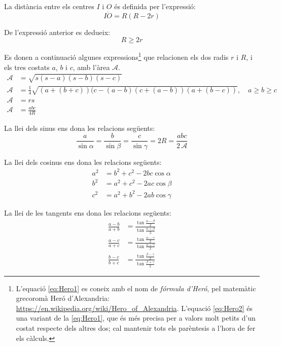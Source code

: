 La distància entre els centres $I$ i $O$ és definida per l'expressió:
\begin{equation}
	\overline{IO} = R(R-2r)
\end{equation}

De l'expressió anterior es dedueix:
\begin{equation}
	R  \geq 2r
\end{equation}

Es donen a continuació algunes expressions\footnote{L'equació \eqref{eq:Hero1} es coneix amb el nom de \emph{fórmula d'Heró}, pel matemàtic grecoromà Heró d'Alexandria: \href{https://en.wikipedia.org/wiki/Hero_of_Alexandria}{https:/\!\!/en.wikipedia.org/wiki/Hero\_of\_Alexandria}. L'equació \eqref{eq:Hero2} és una variant  de la \eqref{eq:Hero1}, que és més precisa per a valors molt petits d'un costat respecte dels altres dos; cal mantenir tots els parèntesis a l'hora de fer els càlculs.} que relacionen els dos radis $r$ i $R$, i els tres costats $a$, $b$ i $c$,  amb l'àrea $\mathscr{A}$.
\begin{align}
	\mathscr{A} &= \sqrt{s (s-a) (s-b) (s-c)} \label{eq:Hero1} \\
	\mathscr{A} &=\frac{1}{4} \sqrt{(a+(b+c)) (c-(a-b) (c+(a-b)) (a+(b-c))}, \quad a \geq b\geq c \label{eq:Hero2}\\
	\mathscr{A} &= r s \\ 
	\mathscr{A} &= \frac{a b c}{4R} 
\end{align}

La llei dels sinus ens dona les relacions següents:
\begin{equation}
    \frac{a}{\sin\alpha} = \frac{b}{\sin\beta} =
    \frac{c}{\sin\gamma} = 2 R = \frac{a b c}{2\,\mathscr{A}}
\end{equation}

La llei dels cosinus ens dona les relacions següents:
\begin{subequations}
\begin{align}
    a^2 &= b^2 + c^2 - 2 b c \cos\alpha \\[1ex]
    b^2 &= a^2 + c^2 - 2 a c \cos\beta \\[1ex]
    c^2 &= a^2 + b^2 - 2 a b \cos\gamma
\end{align}
\end{subequations}

La llei de les tangents ens dona les relacions següents:
\begin{subequations}
\begin{align}
    \frac{a-b}{a+b} &= \frac{\tan\frac{\alpha-\beta}{2}}{\tan\frac{\alpha+\beta}{2}} \\[1ex]
    \frac{a-c}{a+c} &= \frac{\tan\frac{\alpha-\gamma}{2}}{\tan\frac{\alpha+\gamma}{2}} \\[1ex]
    \frac{b-c}{b+c} &= \frac{\tan\frac{\beta-\gamma}{2}}{\tan\frac{\beta+\gamma}{2}}
\end{align}
\end{subequations}

